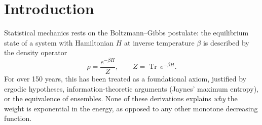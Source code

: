 \documentclass[12pt]{article}
\theoremstyle{plain}
\theoremstyle{definition}
\numberwithin{equation}{section}
\DeclareMathOperator{\Tr}{Tr}
\begin{document}
\begin{titlepage}
\begin{abstract}
The paper establishes five results, each proved from first principles:
\begin{enumerate}[label=(\roman*)]
\item The Kimura--Th\'evenin principle (Schur complement reduction) is
      algebraically identical to Gaussian hidden-mode elimination, making
      LoNalogy a temperature-free generalisation of the coarse-graining
      core of statistical mechanics.
\item The Boltzmann factor $e^{-\beta E}$ is not a postulate but the
      coordinate expression of the $q$-uniformisation
      $Q=e^{-2\pi\tau_2}$ of $X(2)$.
\item The Matsubara frequency ladder and Bose/Fermi statistics arise
      from the spin structure (half-characteristic sectors) of the
      determinant fiber on $X(2)$.
\item The KMS condition is a theorem of Tomita--Takesaki modular theory
      applied to the $X(2)$-parameterised faithful state, not a
      thermodynamic axiom.
\item The Gibbs variational principle follows as a relative-entropy
      corollary of the KMS state.
\end{enumerate}
The universal projected-determinant theorem (vi) then shows that
\emph{every} finite-volume Gibbs system embeds into this structure.
The single remaining open problem is locality-preserving low-rank
compression of this embedding.
\end{abstract}
\end{titlepage}

\setcounter{page}{1}
\tableofcontents
\newpage


\section*{Introduction}

Statistical mechanics rests on the Boltzmann--Gibbs postulate: the
equilibrium state of a system with Hamiltonian $H$ at inverse
temperature $\beta$ is described by the density operator
\begin{equation}\label{eq:gibbs}
\rho = \frac{e^{-\beta H}}{Z},\qquad
Z = \Tr\,e^{-\beta H}.
\end{equation}
For over 150 years, this has been treated as a foundational axiom,
justified by ergodic hypotheses, information-theoretic arguments
(Jaynes' maximum entropy), or the equivalence of ensembles.  None of
these derivations explains \emph{why} the weight is exponential in the
energy, as opposed to any other monotone decreasing function.
\end{document}
